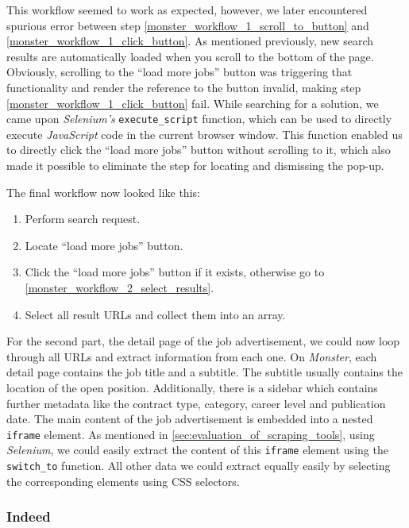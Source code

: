\documentclass[runningheads]{llncs}
\begin{document}
This workflow seemed to work as expected, however, we later encountered spurious error between step \ref{monster_workflow_1_scroll_to_button} and \ref{monster_workflow_1_click_button}. As mentioned previously, new search results are automatically loaded when you scroll to the bottom of the page. Obviously, scrolling to the “load more jobs” button was triggering that functionality and render the reference to the button invalid, making step \ref{monster_workflow_1_click_button} fail. While searching for a solution, we came upon \textit{Selenium's} \texttt{execute\_script} function, which can be used to directly execute \textit{JavaScript} code in the current browser window. This function enabled us to directly click the “load more jobs” button without scrolling to it, which also made it possible to eliminate the step for locating and dismissing the pop-up.

The final workflow now looked like this:

\begin{enumerate}
  \item Perform search request.
  \item Locate “load more jobs” button.
  \item Click the “load more jobs” button if it exists, otherwise go to \ref{monster_workflow_2_select_results}.
  \item \label{monster_workflow_2_select_results}
    Select all result URLs and collect them into an array.
\end{enumerate}

For the second part, the detail page of the job advertisement, we could now loop through all URLs and extract information from each one. On \textit{Monster}, each detail page contains the job title and a subtitle. The subtitle usually contains the location of the open position. Additionally, there is a sidebar which contains further metadata like the contract type, category, career level and publication date. The main content of the job advertisement is embedded into a nested \texttt{iframe} element. As mentioned in \autoref{sec:evaluation_of_scraping_tools}, using \textit{Selenium}, we could easily extract the content of this \texttt{iframe} element using the \texttt{switch\_to} function. All other data we could extract equally easily by selecting the corresponding elements using CSS selectors.

\subsubsection{Indeed}
\label{subsub:indeed}
\end{document}
